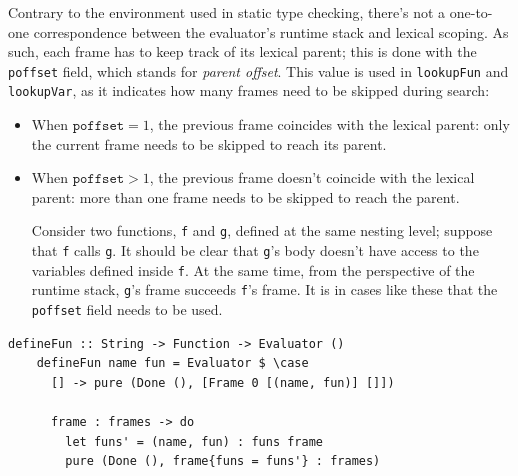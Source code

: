 \documentclass[UdineBachThesis,american,11pt]{PhdThesis}
\begin{document}
  Contrary to the environment used in static type checking, there's not a
  one-to-one correspondence between the evaluator's runtime stack and lexical
  scoping. As such, each frame has to keep track of its lexical parent; this is
  done with the \mbox{\texttt{poffset}} field, which stands for \emph{parent
  offset}. This value is used in \mbox{\texttt{lookupFun}} and
  \mbox{\texttt{lookupVar}}, as it indicates how many frames need to be skipped
  during search:

  \begin{itemize}
    \item When \mbox{$\mathtt{poffset} = 1$}, the previous frame coincides with
    the lexical parent: only the current frame needs to be skipped to reach its
    parent.

    \item When \mbox{$\mathtt{poffset} > 1$}, the previous frame doesn't
    coincide with the lexical parent: more than one frame needs to be skipped to
    reach the parent.

    Consider two functions, \texttt{f} and \texttt{g}, defined at the same
    nesting level; suppose that \texttt{f} calls \texttt{g}. It should be clear
    that \texttt{g}'s body doesn't have access to the variables defined inside
    \texttt{f}. At the same time, from the perspective of the runtime stack,
    \texttt{g}'s frame succeeds \texttt{f}'s frame. It is in cases like these
    that the \mbox{\texttt{poffset}} field needs to be used.
  \end{itemize}

  \begin{Verbatim}[gobble=4,fontsize=\small]
    defineFun :: String -> Function -> Evaluator ()
    defineFun name fun = Evaluator $ \case
      [] -> pure (Done (), [Frame 0 [(name, fun)] []])

      frame : frames -> do
        let funs' = (name, fun) : funs frame
        pure (Done (), frame{funs = funs'} : frames)
  \end{Verbatim}

  \pagebreak
\end{document}
